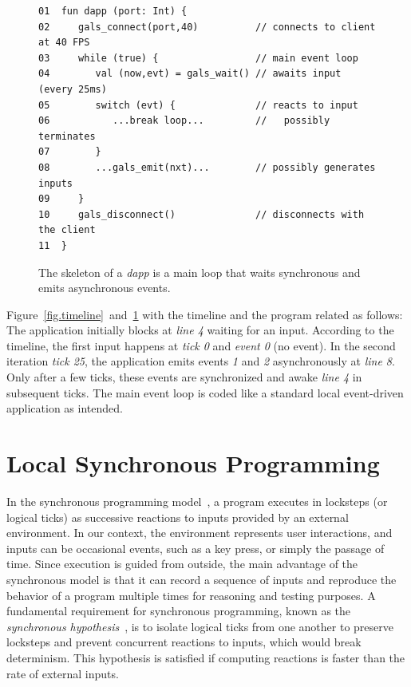 \documentclass[sigplan,screen]{acmart}
\newcommand{\dapp}{\emph{dapp}\xspace}
\begin{document}
\begin{figure}[t]
{\scriptsize
\begin{verbatim}
01  fun dapp (port: Int) {
02     gals_connect(port,40)          // connects to client at 40 FPS
03     while (true) {                 // main event loop
04        val (now,evt) = gals_wait() // awaits input (every 25ms)
05        switch (evt) {              // reacts to input
06           ...break loop...         //   possibly terminates
07        }
08        ...gals_emit(nxt)...        // possibly generates inputs
09     }
10     gals_disconnect()              // disconnects with the client
11  }
\end{verbatim}
}
  \caption{
    \label{fig.skel}
    The skeleton of a \dapp is a main loop that waits synchronous and emits
    asynchronous events.
  }
\end{figure}

Figure~\ref{fig.timeline}~and~\ref{fig.skel} with the timeline and the program
related as follows:
The application initially blocks at \emph{line 4} waiting for an input.
According to the timeline, the first input happens at \emph{tick 0} and
\emph{event 0} (no event).
In the second iteration \emph{tick 25}, the application emits events \emph{1}
and \emph{2} asynchronously at \emph{line 8}.
Only after a few ticks, these events are synchronized and awake \emph{line 4}
in subsequent ticks.
The main event loop is coded like a standard local event-driven application as
intended.

\section{Local Synchronous Programming}
\label{sec.sync}

In the synchronous programming model~\cite{sync}, a program executes in
locksteps (or logical ticks) as successive reactions to inputs provided by an
external environment.
In our context, the environment represents user interactions, and inputs can be
occasional events, such as a key press, or simply the passage of time.
Since execution is guided from outside, the main advantage of the synchronous
model is that it can record a sequence of inputs and reproduce the behavior of
a program multiple times for reasoning and testing purposes.
A fundamental requirement for synchronous programming, known as the
\emph{synchronous hypothesis}~\cite{hypo}, is to isolate logical ticks from one
another to preserve locksteps and prevent concurrent reactions to inputs, which
would break determinism.
This hypothesis is satisfied if computing reactions is faster than the rate of
external inputs.
\end{document}
